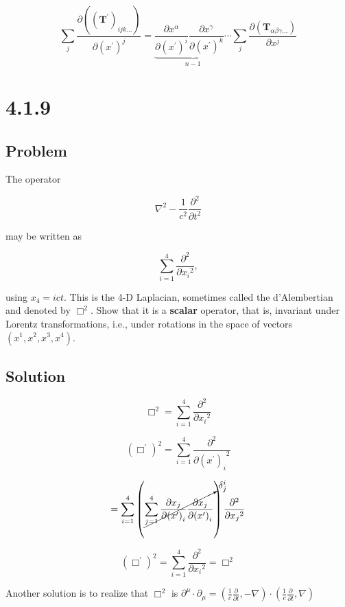 \documentclass[12pt]{article}
\begin{document}
\[
    \sum_j
    \frac
    {\partial \left({\left(\textbf{T}^\prime\right)}_{ijk \ldots}\right)}
    {\partial {\left(x^\prime\right)}^j}
    = \underbrace{\frac{\partial x^\alpha}{\partial {\left(x^\prime\right)}^i}
        \frac{\partial x^\gamma}{\partial {\left(x^\prime\right)}^k}
        \cdots}_{n - 1}
    \sum_j
    \frac
    {\partial \left(\textbf{T}_{\alpha \beta \gamma \ldots}\right)}
    {\partial x^j}
\]

\newpage
\section{4.1.9}

\subsection{Problem}

The operator

\[
    \nabla^2 - \frac{1}{c^2} \frac{\partial^2}{\partial t^2}
\]

may be written as

\[
    \sum^4_{i = 1} \frac{\partial^2}{\partial {x_i}^2},
\]

using \(x_4 = ict\). This is the 4-D Laplacian, sometimes called the d'Alember\-tian and denoted
by \(\Box^2\). Show that it is a \textbf{scalar} operator, that is, invariant under Lorentz
transformations, i.e., under rotations in the space of vectors \((x^1, x^2, x^3, x^4)\).

\subsection{Solution}

\[
    \Box^2 = \sum^4_{i = 1} \frac{\partial^2}{\partial {x_i}^2}
\]

\[
    \left(\Box^\prime\right)^2
    = \sum^4_{i = 1} \frac{\partial^2}{\partial {{\left(x^\prime\right)}_i}^2}
\]

\[
    = \sum^4_{i = 1}
    \left(\cancelto{\delta^i_j}{\sum^4_{j = 1} \frac{\partial {x_j}}{\partial {{\left(x^\prime\right)}_i}}
        \frac{\partial {x_j}}{\partial {{\left(x^\prime\right)}_i}}}\right)
    \frac{\partial^2}{\partial {x_j}^2}
\]

\[
    \left(\Box^\prime\right)^2
    = \sum^4_{i = 1} \frac{\partial^2}{\partial {x_i}^2}
    = \Box^2
\]

Another solution is to realize that \(\Box^2\) is \(\partial^\mu \cdot \partial_\mu = \left(\frac{1}{c} \frac{\partial}{\partial t},-\nabla\right) \cdot \left(\frac{1}{c} \frac{\partial}{\partial t}, \nabla\right)\)

\newpage


\nocite{arfken2013mathematical}
\nocite{El-Deeb_PEU-356_Assignments}
\end{document}
